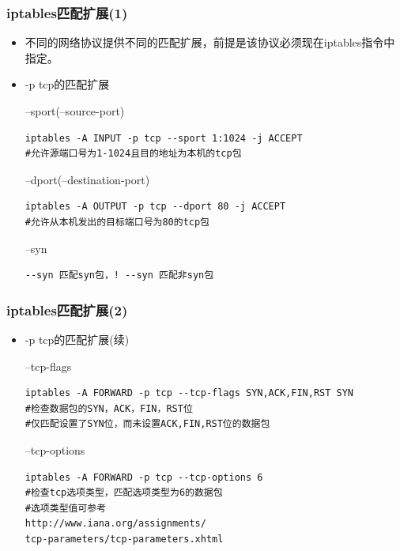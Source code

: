 \documentclass[xcolor=svgnames,presentation]{beamer}
\begin{document}
\begin{frame}[fragile]
\frametitle{iptables匹配扩展(1)}
\label{sec-2-23}
\begin{itemize}

\item 不同的网络协议提供不同的匹配扩展，前提是该协议必须现在iptables指令中指定。
\label{sec-2-23-1}%

\item -p tcp的匹配扩展
\label{sec-2-23-2}%
\begin{exampleblock}{--sport(--source-port)}
\label{sec-2-23-2-1}


\begin{verbatim}
iptables -A INPUT -p tcp --sport 1:1024 -j ACCEPT
#允许源端口号为1-1024且目的地址为本机的tcp包
\end{verbatim}
\end{exampleblock}
\begin{block}{--dport(--destination-port)}
\label{sec-2-23-2-2}


\begin{verbatim}
iptables -A OUTPUT -p tcp --dport 80 -j ACCEPT
#允许从本机发出的目标端口号为80的tcp包
\end{verbatim}
\end{block}
\begin{exampleblock}{--syn}
\label{sec-2-23-2-3}


\begin{verbatim}
--syn 匹配syn包，! --syn 匹配非syn包
\end{verbatim}
\end{exampleblock}
\end{itemize} %
\end{frame}
\begin{frame}[fragile]
\frametitle{iptables匹配扩展(2)}
\label{sec-2-24}
\begin{itemize}

\item -p tcp的匹配扩展(续)
\label{sec-2-24-1}%
\begin{exampleblock}{--tcp-flags}
\label{sec-2-24-1-1}


\begin{verbatim}
iptables -A FORWARD -p tcp --tcp-flags SYN,ACK,FIN,RST SYN
#检查数据包的SYN，ACK，FIN，RST位
#仅匹配设置了SYN位，而未设置ACK,FIN,RST位的数据包
\end{verbatim}
\end{exampleblock}
\begin{block}{--tcp-options}
\label{sec-2-24-1-2}


\begin{verbatim}
iptables -A FORWARD -p tcp --tcp-options 6
#检查tcp选项类型，匹配选项类型为6的数据包
#选项类型值可参考
http://www.iana.org/assignments/
tcp-parameters/tcp-parameters.xhtml
\end{verbatim}
\end{block}
\end{itemize} %
\end{frame}
\end{document}
